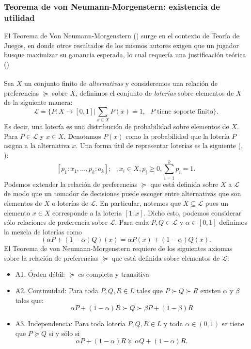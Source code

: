 \documentclass[11pt]{article}
\theoremstyle{plain}
\begin{document}
\subsubsection{Teorema de von Neumann-Morgenstern: existencia de utilidad}
El Teorema de Von Neumann-Morgenstern (\cite{von1944theory}) surge en el contexto de Teoría de Juegos, en donde otros resultados de los mismos autores exigen que un jugador busque maximizar su ganancia esperada, lo cual requería una justificación teórica (\cite{gilboa2009decision})\\
\\
\indent Sea $X$ un conjunto finito de \textit{alternativas} y consideremos una relación de preferencias $\succeq$ sobre $X$, definimos el conjunto de \textit{loterías} sobre elementos de $X$ de la siguiente manera:
\[ \mathcal{L} = \{ P:X \to [0,1] | \sum_{x \in X} P(x) = 1, \textrm{ $P$ tiene soporte finito} \}. \]
\indent Es decir, una lotería es una distribución de probabilidad sobre elementos de $X$. Para $P \in \mathcal{L}$ y $x \in X$. Denotamos $P(x)$ como la probabilidad que la lotería $P$ asigna a la alternativa $x$. Una forma útil de representar loterías es la siguiente (\cite{sucar2015probabilistic}, \cite{shoham2008multiagent}):
\[ [p_1: x_1, ... , p_k : o_k]; \textrm{  }, x_i \in X, p_i \geq 0, \sum_{i=1}^k  p_i = 1.\]
\indent Podemos extender la relación de preferencias $\succeq$ que está definida sobre $X$ a $\mathcal{L}$ de modo que un tomador de decisiones puede escoger entre alternativas que son elementos de $X$ o loterías de $\mathcal{L}$. En particular, notemos que $X \subseteq \mathcal{L}$ pues un elemento $x \in X$ corresponde a la lotería $[1:x]$. Dicho esto, podemos considerar sólo relaciones de preferencia sobre $\mathcal{L}$. Para cada $P, Q \in \mathcal{L}$ y $\alpha \in [0,1]$ definimos la mezcla de loterías como
\[ (\alpha P + (1- \alpha)Q)(x) = \alpha P(x) + (1-\alpha)Q(x). \]
\indent El Teorema de von Neumann-Morgenstern requiere de los siguientes axiomas sobre la relación de preferencias $\succeq$ que está definida sobre elementos de $\mathcal{L}$:
\begin{itemize}
\item A1. Órden débil: $\succeq$ es completa y transitiva
\item A2. Continuidad: Para toda $P,Q,R \in L$ tales que $P \succ Q \succ R$ existen $\alpha$ y $\beta$ tales que:
\[  \alpha P + (1-\alpha) R \succ Q \succ \beta P + (1-\beta) R\]
\item A3. Independencia: Para toda lotería $P,Q,R \in L$ y toda $\alpha \in (0,1)$ se tiene que $P \succeq Q$ si y sólo si 
\[\alpha P + (1-\alpha) R \succeq \alpha Q  + (1-\alpha) R.\]
\end{itemize}
\end{document}
